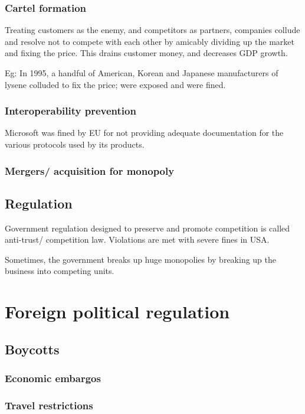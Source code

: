 \documentclass[oneside, article]{memoir}
\begin{document}
\subsubsection{Cartel formation}
Treating customers as the enemy, and competitors as partners, companies collude and resolve not to compete with each other by amicably dividing up the market and fixing the price. This drains customer money, and decreases GDP growth.

Eg: In 1995, a handful of American, Korean and Japanese manufacturers of lysene colluded to fix the price; were exposed and were fined.

\subsubsection{Interoperability prevention}
Microsoft was fined by EU for not providing adequate documentation for the various protocols used by its products.

\subsubsection{Mergers/ acquisition for monopoly}
\tbc

\subsection{Regulation}
Government regulation designed to preserve and promote competition is called anti-trust/ competition law. Violations are met with severe fines in USA.

Sometimes, the government breaks up huge monopolies by breaking up the business into competing units.

\section{Foreign political regulation}
\subsection{Boycotts}
\subsubsection{Economic embargos}
\tbc

\subsubsection{Travel restrictions}
\tbc
\end{document}
